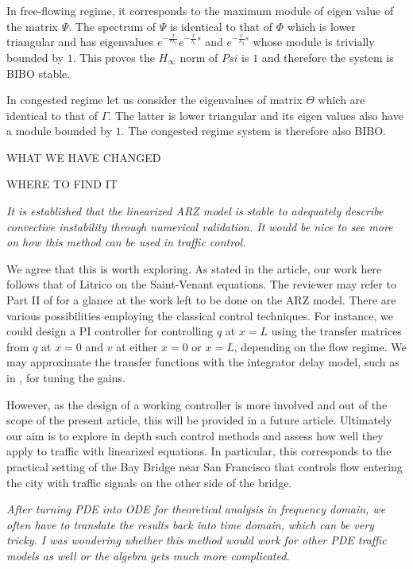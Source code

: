 \documentclass{article}
\begin{document}
In free-flowing regime, it corresponds to the maximum module of eigen value of the matrix $\Psi$. The spectrum of $\Psi$ is identical to that of $\Phi$ which is lower triangular and has eigenvalues 
$
e^{ - \frac{x}{\tau \lambda_1}}
e^{ - \frac{x}{\lambda_1} s}
$
and
$
e^{ - \frac{x}{\lambda_2} s}
$
whose module is trivially bounded by $1$.
This proves the $H_{\infty}$ norm of $Psi$ is $1$ and therefore the system is BIBO stable.

In congested regime let us consider the eigenvalues of matrix $\Theta$ which are identical to that of $\Gamma$.
The latter is lower triangular and its eigen values also have a module bounded by $1$.
The congested regime system is therefore also BIBO.

WHAT WE HAVE CHANGED

WHERE TO FIND IT

\emph{
It is established that the linearized ARZ model is stable to adequately describe convective instability through numerical validation. It would be nice to see more on how this method can be used in traffic control.
}

We agree that this is worth exploring. As stated in the article, our work here follows that of Litrico on the Saint-Venant equations. The reviewer may refer to Part II of \cite{Litricobook} for a glance at the work left to be done on the ARZ model. There are various possibilities employing the classical control techniques. For instance, we could design a PI controller for controlling $q$ at $x = L$ using the transfer matrices from $q$ at $x = 0$ and $v$ at either $x = 0$ or $x = L$, depending on the flow regime. We may approximate the transfer functions with the integrator delay model, such as in \cite{Litricosimp}, for tuning the gains. 

However, as the design of a working controller is more involved and out of the scope of the present article, this will be provided in a future article. Ultimately our aim is to explore in depth such control methods and assess how well they apply to traffic with linearized equations. In particular, this corresponds to the practical setting of the Bay Bridge near San Francisco that controls flow entering the city with traffic signals on the other side of the bridge. \\

\bigskip{}

\emph{
After turning PDE into ODE for theoretical analysis in frequency domain, we often have to translate the results back into time domain, which can be very tricky. I was wondering whether this method would work for other PDE traffic models as well or the algebra gets much more complicated.
}
\end{document}
